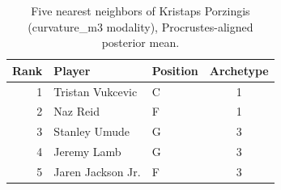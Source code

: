 \begin{table}[htbp]
  \centering\small
  \begin{tabular}{rllc}
    \toprule
    Rank & Player & Position & Archetype \\
    \midrule
    1 & Tristan Vukcevic & C & 1 \\
    2 & Naz Reid & F & 1 \\
    3 & Stanley Umude & G & 3 \\
    4 & Jeremy Lamb & G & 3 \\
    5 & Jaren Jackson Jr. & F & 3 \\
    \bottomrule
  \end{tabular}
  \caption{Five nearest neighbors of Kristaps Porzingis (curvature_m3 modality), Procrustes-aligned posterior mean.}
  \label{tab:Kristaps_Porzingis_neighbors_curvature_m3}
\end{table}

